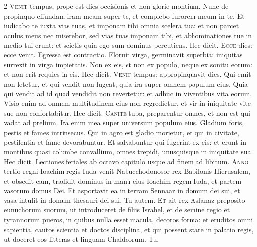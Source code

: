 \begin{multicols*}{2}
\lettrine[lines=2]{\zallmancaps \color{Red} V}{enit} tempus, prope est dies occisionis et non glorie montium. Nunc de propinquo effundam iram meam super te, et complebo furorem meum in te. Et iudicabo te iuxta vias tuas, et imponam tibi omnia scelera tua: et non parcet oculus meus nec miserebor, sed vias tuas imponam tibi, et abhominationes tue in medio tui erunt: et scietis quia ego sum dominus percutiens. Hec dicit.
\lettrine[lines=2]{\zallmancaps \color{Blue} E}{cce} dies: ecce venit. Egressa est contractio. Floruit virga, germinavit superbia: iniquitas surrexit in virga impietatis. Non ex eis, et non ex populo, neque ex sonitu eorum: et non erit requies in eis. Hec dicit.
\lettrine[lines=2]{\zallmancaps \color{Red} V}{enit} tempus: appropinquavit dies. Qui emit non letetur, et qui vendit non lugeat, quia ira super omnem populum eius. Quia qui vendit ad id quod vendidit non revertetur: et adhuc in viventibus vita eorum. Visio enim ad omnem multitudinem eius non regredietur, et vir in iniquitate vite sue non confortabitur. Hec dicit.
\lettrine[lines=2]{\zallmancaps \color{Blue} C}{anite} tuba, preparentur omnes, et non est qui vadat ad prelium. Ira enim mea super universum populum eius. Gladium foris, pestis et fames intrinsecus. Qui in agro est gladio morietur, et qui in civitate, pestilentia et fame devorabuntur. Et salvabuntur qui fugerint ex eis: et erunt in montibus quasi columbe convallium, omnes trepidi, unusquisque in iniquitate sua. Hec dicit.
\newline \ul{Lectiones feriales ab octavo capitulo usque ad finem ad libitum.}
{\color{Red} }
\lettrine[lines=2]{\zallmancaps \color{Red} A}{nno} tertio regni Ioachim regis Iuda venit Nabucchodonosor rex Babilonis Hierusalem, et obsedit eam, tradidit dominus in manu eius Ioachim regem Iuda, et partem vasorum domus Dei. Et asportavit ea in terram Sennaar in domum dei sui, et vasa intulit in domum thesauri dei sui. Tu autem.
\lettrine[lines=2]{\zallmancaps \color{Blue} E}{t} ait rex Asfanaz preposito eunuchorum suorum, ut introduceret de filiis Israhel, et de semine regio et tyrannorum pueros, in quibus nulla esset macula, decoros forma: et eruditos omni sapientia, cautos scientia et doctos disciplina, et qui possent stare in palatio regis, ut doceret eos litteras et linguam Chaldeorum. Tu.

\end{multicols*}
